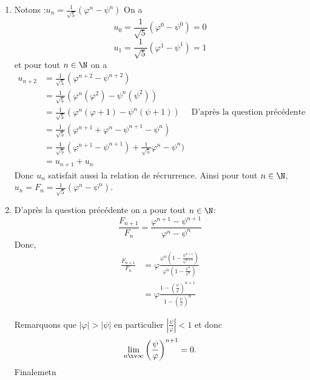 \begin{correction}
\begin{enumerate}
\item  Notons  :$u_n =\frac{1}{\sqrt{5}}(\varphi^n-\psi^n)$ 
On a 
$$u_0= \frac{1}{\sqrt{5}}(\varphi^0-\psi^0)=0$$
$$u_1= \frac{1}{\sqrt{5}}(\varphi^1-\psi^1)=1$$
et pour tout $n\in\N$ on a 
\begin{align*}
u_{n+2} &= \frac{1}{\sqrt{5}}(\varphi^{n+2}-\psi^{n+2}) \\
			&= \frac{1}{\sqrt{5}}(\varphi^n (\varphi^2)-\psi^n (\psi^2) ) \\
			&= \frac{1}{\sqrt{5}}(\varphi^n (\varphi +1)-\psi^n (\psi +1)  ) \quad \text{ D'après la question précédente} \\			
			&= \frac{1}{\sqrt{5}}(\varphi^{n+1} +\varphi^n-\psi^{n+1} -\psi^n   ) \\
			&= \frac{1}{\sqrt{5}}(\varphi^{n+1} -\psi^{n+1}) +  \frac{1}{\sqrt{5}} \varphi^n-\psi^n   ) \\
			&=u_{n+1}+u_n
\end{align*}
Donc $u_n$ satisfait aussi la relation de récrurrence. 
Ainsi  pour tout $n\in \N$, $u_n=F_n= \frac{1}{\sqrt{5}}(\varphi^n-\psi^n)$. 


\item D'après la question précédente on a pour tout $n\in \N$: 
$$\frac{F_{n+1}}{F_n} =  \frac{\varphi^{n+1}-\psi^{n+1}}{\varphi^n-\psi^n}$$
Donc,
\begin{align*}
\frac{F_{n+1}}{F_n} &=\varphi \frac{\varphi^{n}\left(1-\frac{\psi^{n+1}}{\varphi^{n+1}}\right)}{\varphi^n\left(1-\frac{\psi^n}{\varphi^n}\right)}\\
&=\varphi \frac{1-\left(\frac{\psi}{\varphi}\right)^{n+1}}{1-\left(\frac{\psi}{\varphi}\right)^n}
\end{align*}


Remarquons que $|\varphi| >|\psi|$ en particulier $|\frac{\psi}{\varphi}|<1$ et donc 
$$\lim_{n\tv \infty} \left(\frac{\psi}{\varphi}\right)^{n+1} =0.$$
Finalemetn 
\begin{center}
\end{center}

\end{enumerate}

\end{correction}






